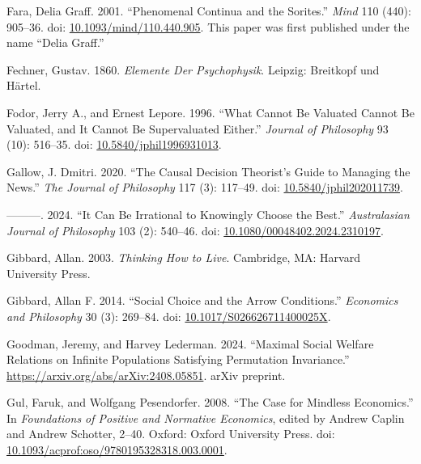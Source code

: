 \documentclass[
  11pt,
  letterpaper,
  DIV=11,
  numbers=noendperiod,
  twoside]{scrartcl}
\newlength{\cslhangindent}
\newenvironment{CSLReferences}[2] %
 {\begin{list}{}{%
  \setlength{\itemindent}{0pt}
  \setlength{\leftmargin}{0pt}
  \setlength{\parsep}{0pt}
  \ifodd #1
   \setlength{\leftmargin}{\cslhangindent}
   \setlength{\itemindent}{-1\cslhangindent}
  \fi
  \setlength{\itemsep}{#2\baselineskip}}}
 {\end{list}}
\begin{document}
\begin{CSLReferences}{1}{0}
Fara, Delia Graff. 2001. {``Phenomenal Continua and the Sorites.''}
\emph{Mind} 110 (440): 905--36. doi:
\href{https://doi.org/10.1093/mind/110.440.905}{10.1093/mind/110.440.905}.
This paper was first published under the name {``Delia Graff.''}

Fechner, Gustav. 1860. \emph{Elemente Der Psychophysik}. Leipzig:
Breitkopf und H{ä}rtel.

Fodor, Jerry A., and Ernest Lepore. 1996. {``What Cannot Be Valuated
Cannot Be Valuated, and It Cannot Be Supervaluated Either.''}
\emph{Journal of Philosophy} 93 (10): 516--35. doi:
\href{https://doi.org/10.5840/jphil1996931013}{10.5840/jphil1996931013}.

Gallow, J. Dmitri. 2020. {``The Causal Decision Theorist's Guide to
Managing the News.''} \emph{The Journal of Philosophy} 117 (3): 117--49.
doi:
\href{https://doi.org/10.5840/jphil202011739}{10.5840/jphil202011739}.

---------. 2024. {``It Can Be Irrational to Knowingly Choose the
Best.''} \emph{Australasian Journal of Philosophy} 103 (2): 540--46.
doi:
\href{https://doi.org/10.1080/00048402.2024.2310197}{10.1080/00048402.2024.2310197}.

Gibbard, Allan. 2003. \emph{Thinking How to Live}. Cambridge, MA:
Harvard University Press.

Gibbard, Allan F. 2014. {``Social Choice and the Arrow Conditions.''}
\emph{Economics and Philosophy} 30 (3): 269--84. doi:
\href{https://doi.org/10.1017/S026626711400025X}{10.1017/S026626711400025X}.

Goodman, Jeremy, and Harvey Lederman. 2024. {``Maximal Social Welfare
Relations on Infinite Populations Satisfying Permutation Invariance.''}
\url{https://arxiv.org/abs/arXiv:2408.05851}. arXiv preprint.

Gul, Faruk, and Wolfgang Pesendorfer. 2008. {``The Case for Mindless
Economics.''} In \emph{Foundations of Positive and Normative Economics},
edited by Andrew Caplin and Andrew Schotter, 2--40. Oxford: Oxford
University Press. doi:
\href{https://doi.org/10.1093/acprof:oso/9780195328318.003.0001}{10.1093/acprof:oso/9780195328318.003.0001}.


\end{CSLReferences}
\end{document}
